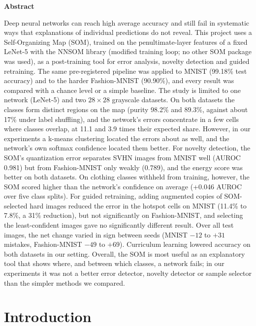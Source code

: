 \documentclass{scrartcl}
\renewenvironment{abstract}{
    \centering
    \textbf{Abstract}
    \vspace{0.5cm}
    \par\itshape\small
    \begin{minipage}{0.9\linewidth}}{\end{minipage}
    \noindent\ignorespaces
}
\begin{document}
\begin{titlepage}
	\vfill
	\begin{abstract}
	Deep neural networks can reach high average accuracy and still fail in systematic ways that explanations of individual predictions do not reveal. This project uses a Self-Organizing Map (SOM), trained on the penultimate-layer features of a fixed LeNet-5 with the NNSOM library (modified training loop; no other SOM package was used), as a post-training tool for error analysis, novelty detection and guided retraining. The same pre-registered pipeline was applied to MNIST (99.18\% test accuracy) and to the harder Fashion-MNIST (90.90\%), and every result was compared with a chance level or a simple baseline. The study is limited to one network (LeNet-5) and two $28\times28$ grayscale datasets. On both datasets the classes form distinct regions on the map (purity 98.2\% and 89.3\%, against about 17\% under label shuffling), and the network's errors concentrate in a few cells where classes overlap, at 11.1 and 3.9 times their expected share. However, in our experiments a k-means clustering located the errors about as well, and the network's own softmax confidence located them better. For novelty detection, the SOM's quantization error separates SVHN images from MNIST well (AUROC 0.981) but from Fashion-MNIST only weakly (0.789), and the energy score was better on both datasets. On clothing classes withheld from training, however, the SOM scored higher than the network's confidence on average (+0.046 AUROC over five class splits). For guided retraining, adding augmented copies of SOM-selected hard images reduced the error in the hotspot cells on MNIST (11.4\% to 7.8\%, a 31\% reduction), but not significantly on Fashion-MNIST, and selecting the least-confident images gave no significantly different result. Over all test images, the net change varied in sign between seeds (MNIST $-12$ to $+31$ mistakes, Fashion-MNIST $-49$ to $+69$). Curriculum learning lowered accuracy on both datasets in our setting. Overall, the SOM is most useful as an explanatory tool that shows where, and between which classes, a network fails; in our experiments it was not a better error detector, novelty detector or sample selector than the simpler methods we compared.
	\end{abstract}
	\vfill
\end{titlepage}
\tableofcontents
\newpage
\section{Introduction}
\end{document}
